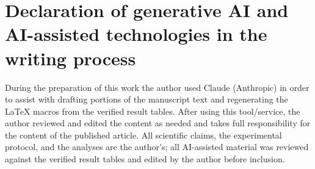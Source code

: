 \documentclass[preprint,12pt]{elsarticle}
\begin{document}
\section*{Declaration of generative AI and AI-assisted technologies in the writing process}
During the preparation of this work the author used Claude (Anthropic) in order to
assist with drafting portions of the manuscript text and regenerating the LaTeX
macros from the verified result tables. After using this tool/service, the author
reviewed and edited the content as needed and takes full responsibility for the content
of the published article. All scientific claims, the experimental protocol, and the
analyses are the author's; all AI-assisted material was reviewed against the verified
result tables and edited by the author before inclusion.



\end{document}
